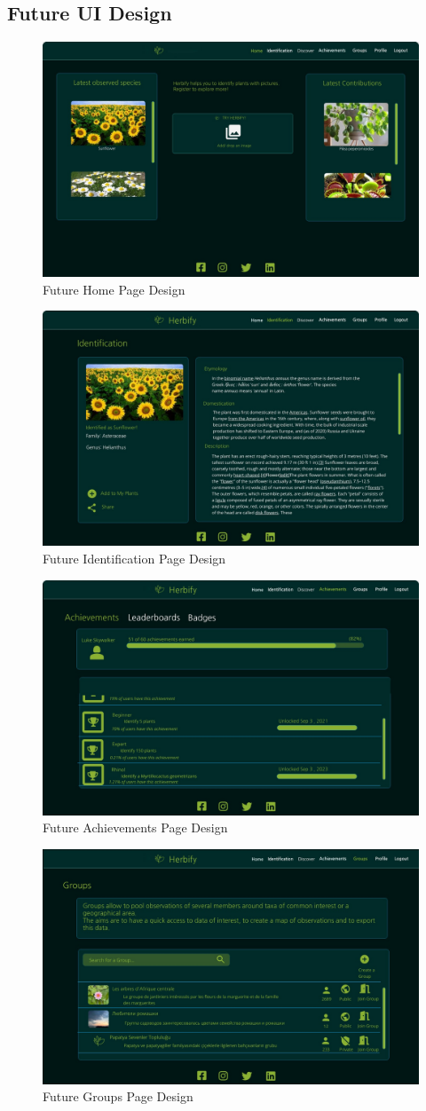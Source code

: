 \documentclass[conference]{IEEEtran}
\begin{document}
\subsection{Future UI Design}

\begin{figure}[H]
\centerline{\includegraphics[width=0.48 \textwidth]{images/Home.jpg}}
\caption{Future Home Page Design}
\label{fig:graph1}
\end{figure}


\begin{figure}[H]
\centerline{\includegraphics[width=0.48 \textwidth]{images/IdentificationFuture.jpg}}
\caption{Future Identification Page Design}
\label{fig:graph1}
\end{figure}


\begin{figure}[H]
\centerline{\includegraphics[width=0.48 \textwidth]{images/AchivementsFuture.jpg}}
\caption{Future Achievements Page Design}
\label{fig:graph1}
\end{figure}


\begin{figure}[H]
\centerline{\includegraphics[width=0.48 \textwidth]{images/GroupsFuture.jpg}}
\caption{Future Groups Page Design}
\label{fig:graph1}
\end{figure}
\end{document}
